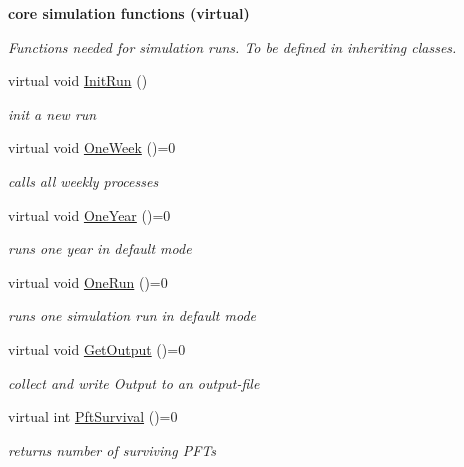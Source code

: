 \begin{Indent}\textbf{ core simulation functions (virtual)}\par
{\em Functions needed for simulation runs. To be defined in inheriting classes. }\begin{DoxyCompactItemize}
\item 
virtual void \mbox{\hyperlink{class_c_envir_af361384ae8ac1d909c2be355ecb19987}{Init\+Run}} ()
\begin{DoxyCompactList}\small\item\em init a new run \end{DoxyCompactList}\item 
\mbox{\label{class_c_envir_aaf79409fdf193613b40fb45a66dba4ee}} 
virtual void \mbox{\hyperlink{class_c_envir_aaf79409fdf193613b40fb45a66dba4ee}{One\+Week}} ()=0
\begin{DoxyCompactList}\small\item\em calls all weekly processes \end{DoxyCompactList}\item 
\mbox{\label{class_c_envir_a7c643b8a91e5bd850632afb4b7572a35}} 
virtual void \mbox{\hyperlink{class_c_envir_a7c643b8a91e5bd850632afb4b7572a35}{One\+Year}} ()=0
\begin{DoxyCompactList}\small\item\em runs one year in default mode \end{DoxyCompactList}\item 
\mbox{\label{class_c_envir_a36cbe82b70ac3bd8741bc6baf0baac84}} 
virtual void \mbox{\hyperlink{class_c_envir_a36cbe82b70ac3bd8741bc6baf0baac84}{One\+Run}} ()=0
\begin{DoxyCompactList}\small\item\em runs one simulation run in default mode \end{DoxyCompactList}\item 
\mbox{\label{class_c_envir_a0327292c6ae32487c4fdde023f4302d5}} 
virtual void \mbox{\hyperlink{class_c_envir_a0327292c6ae32487c4fdde023f4302d5}{Get\+Output}} ()=0
\begin{DoxyCompactList}\small\item\em collect and write Output to an output-\/file \end{DoxyCompactList}\item 
virtual int \mbox{\hyperlink{class_c_envir_a03a7a06d46020790e16f68e52469471a}{Pft\+Survival}} ()=0
\begin{DoxyCompactList}\small\item\em returns number of surviving P\+F\+Ts \end{DoxyCompactList}\end{DoxyCompactItemize}
\end{Indent}

